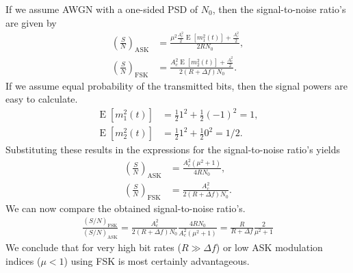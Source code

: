 \documentclass[11pt,titlepage]{report}
\newcommand{\E}[1]{\operatorname{E}\left[#1\right]}
\begin{document}
If we assume AWGN with a one-sided PSD of $N_0$, then the signal-to-noise ratio's are given by
\begin{align*}
	\left(\frac{S}{N}\right)_{\text{ASK}} &= \frac{\mu^2 \frac{A_c^2}{2}\E{m_1^2(t)} + \frac{A_c^2}{2}}{2RN_0}, \\
	\left(\frac{S}{N}\right)_{\text{FSK}} &= \frac{A_c^2 \E{m_2^2(t)} + \frac{A_c^2}{2}}{2(R+\Delta f)N_0}.
\end{align*}
If we assume equal probability of the transmitted bits, then the signal powers are easy to calculate.
\begin{align*}
	\E{m_1^2(t)} &= \frac{1}{2} 1^2 + \frac{1}{2} (-1)^2=1, \\
	\E{m_2^2(t)} &= \frac{1}{2} 1^2 + \frac{1}{2} 0^2=1/2.
\end{align*}
Substituting these results in the expressions for the signal-to-noise ratio's yields
\begin{align*}
	\left(\frac{S}{N}\right)_{\text{ASK}} &= \frac{A_c^2 (\mu^2+1)}{4RN_0}, \\
	\left(\frac{S}{N}\right)_{\text{FSK}} &= \frac{A_c^2}{2(R+\Delta f)N_0}.
\end{align*}
We can now compare the obtained signal-to-noise ratio's.
\begin{align*}
	\frac{(S/N)_{\text{FSK}}}{(S/N)_{\text{ASK}}}=\frac{A_c^2}{2(R+\Delta f)N_0} \frac{4RN_0}{A_c^2 (\mu^2+1)}=\frac{R}{R+\Delta f}\frac{2}{\mu^2 + 1}
\end{align*}
We conclude that for very high bit rates ($R \gg \Delta f$) or low ASK modulation indices ($\mu < 1$) using FSK is most certainly advantageous.
\end{document}
